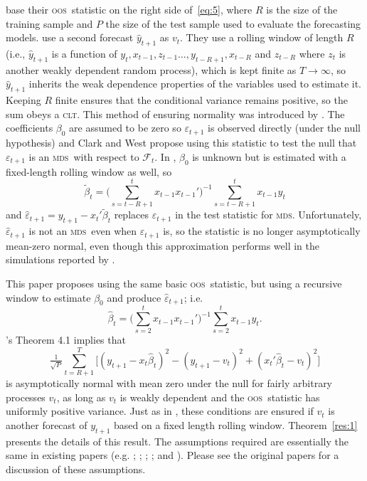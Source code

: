 \documentclass[11pt,fleqn]{article}
\newcommand\citepos[2][]{\citeauthor{#2}'s \citeyearpar[#1]{#2}}
\theoremstyle{definition}
\newcommand{\clt}{\textsc{clt}}
\newcommand{\mds}{\textsc{mds}}
\newcommand{\oos}{\textsc{oos}}
\begin{document}
\citet{ClW:06,ClW:07} base their \oos\ statistic on the right side
of~\eqref{eq:5}, where $R$ is the size of the training sample and $P$
the size of the test sample used to evaluate the forecasting models.
\citet{ClW:06} use a second forecast $\hat{y}_{t+1}$ as $v_t$.  They
use a rolling window of length $R$ (i.e., $\hat{y}_{t+1}$ is a
function of $y_t, x_{t-1}, z_{t-1} \dots, y_{t-R+1}, x_{t-R}$ and
$z_{t-R}$ where $z_t$ is another weakly dependent random process),
which is kept finite as $T \to \infty$, so $\hat{y}_{t+1}$ inherits
the weak dependence properties of the variables used to estimate it.
Keeping $R$ finite ensures that the conditional variance remains
positive, so the sum obeys a \clt.  This method of ensuring normality
was introduced by \citet{GiW:06}.  The coefficients $\beta_0$ are
assumed to be zero so $\varepsilon_{t+1}$ is observed directly (under
the null hypothesis) and Clark and West propose using this statistic
to test the null that $\varepsilon_{t+1}$ is an \mds\ with respect to
$\mathcal{F}_t$.  In \citet{ClW:07}, $\beta_0$ is unknown but is
estimated with a fixed-length rolling window as well, so
\begin{equation*}
  \tilde{\beta}_t = \Big(\sum_{s=t-R+1}^t x_{t-1} x_{t-1}'\Big)^{-1}
  \sum_{s=t-R+1}^t x_{t-1} y_t
\end{equation*}
and $\hat{\varepsilon}_{t+1} = y_{t+1} - x_t'\tilde{\beta}_t$ replaces
$\varepsilon_{t+1}$ in the test statistic for \mds.  Unfortunately,
$\hat{\varepsilon}_{t+1}$ is not an \mds\ even when
$\varepsilon_{t+1}$ is, so the statistic is no longer asymptotically
mean-zero normal, even though this approximation performs well in the
simulations reported by \citet{ClW:07}.

This paper proposes using the same basic \oos\ statistic, 
but using a recursive window to estimate $\beta_0$ and produce
$\hat{\varepsilon}_{t+1}$; i.e.
\begin{equation}
  \label{eq:8}
  \hat{\beta}_t = \Big(\sum_{s=2}^{t} x_{t-1} x_{t-1}'\Big)^{-1}
  \sum_{s=2}^t x_{t-1} y_t.
\end{equation}
\citepos{Wes:96} Theorem 4.1 implies that
\begin{equation*}
  \tfrac{1}{\sqrt{P}} \sum_{t=R+1}^T \Big[(y_{t+1} -
  x_t\hat{\beta}_t)^2 - (y_{t+1} - v_t)^2 + (x_t'\hat{\beta}_t - v_t)^2 \Big]
\end{equation*}
is asymptotically normal with mean zero under the null for fairly
arbitrary processes $v_t$, as long as $v_t$ is weakly dependent and
the \oos\ statistic has uniformly positive variance.  Just as in
\citet{ClW:06}, these conditions are ensured if $v_t$ is another
forecast of $y_{t+1}$ based on a fixed length rolling window.
Theorem~\ref{res:1} presents the details of this result.  The
assumptions required are essentially the same in existing papers
(e.g. \citealp{Wes:96}; \citealp{WeM:98}; \citealp{Mcc:00};
\citealp{GiW:06}; and \citealp{ClW:06,ClW:07}).  Please see the
original papers for a discussion of these assumptions.
\end{document}
